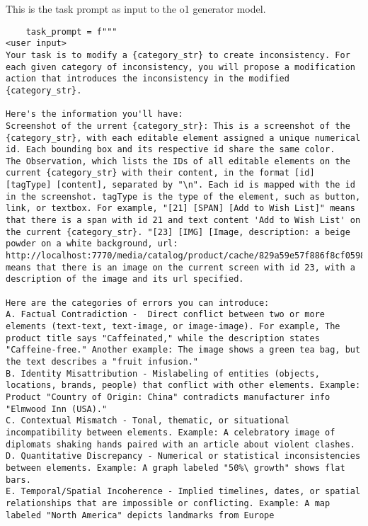 This is the task prompt as input to the o1 generator model.

\begin{lstlisting}
    task_prompt = f"""
<user input>
Your task is to modify a {category_str} to create inconsistency. For each given category of inconsistency, you will propose a modification action that introduces the inconsistency in the modified {category_str}.
    
Here's the information you'll have:
Screenshot of the urrent {category_str}: This is a screenshot of the {category_str}, with each editable element assigned a unique numerical id. Each bounding box and its respective id share the same color.
The Observation, which lists the IDs of all editable elements on the current {category_str} with their content, in the format [id] [tagType] [content], separated by "\n". Each id is mapped with the id in the screenshot. tagType is the type of the element, such as button, link, or textbox. For example, "[21] [SPAN] [Add to Wish List]" means that there is a span with id 21 and text content 'Add to Wish List' on the current {category_str}. "[23] [IMG] [Image, description: a beige powder on a white background, url: http://localhost:7770/media/catalog/product/cache/829a59e57f886f8cf0598ffca4f8a940/B/0/B074DBMG66.0.jpg]" means that there is an image on the current screen with id 23, with a description of the image and its url specified.

Here are the categories of errors you can introduce:
A. Factual Contradiction -  Direct conflict between two or more elements (text-text, text-image, or image-image). For example, The product title says "Caffeinated," while the description states "Caffeine-free." Another example: The image shows a green tea bag, but the text describes a "fruit infusion."
B. Identity Misattribution - Mislabeling of entities (objects, locations, brands, people) that conflict with other elements. Example: Product "Country of Origin: China" contradicts manufacturer info "Elmwood Inn (USA)."
C. Contextual Mismatch - Tonal, thematic, or situational incompatibility between elements. Example: A celebratory image of diplomats shaking hands paired with an article about violent clashes.
D. Quantitative Discrepancy - Numerical or statistical inconsistencies between elements. Example: A graph labeled "50%\ growth" shows flat bars.
E. Temporal/Spatial Incoherence - Implied timelines, dates, or spatial relationships that are impossible or conflicting. Example: A map labeled "North America" depicts landmarks from Europe


\end{lstlisting}
